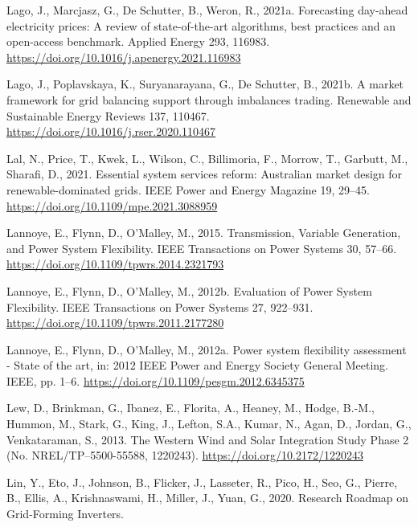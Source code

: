 \documentclass[12pt,a4paper,]{report}
\newlength{\cslhangindent}
\newenvironment{CSLReferences}[2] %
 {%
  \setlength{\parindent}{0pt}
  \ifodd #1 \everypar{\setlength{\hangindent}{\cslhangindent}}\ignorespaces\fi
  \ifnum #2 > 0
  \setlength{\parskip}{#2\baselineskip}
  \fi
 }%
 {}
\begin{document}
\begin{CSLReferences}{1}{0}
\leavevmode{}%
Lago, J., Marcjasz, G., De Schutter, B., Weron, R., 2021a. Forecasting
day-ahead electricity prices: {A} review of state-of-the-art algorithms,
best practices and an open-access benchmark. Applied Energy 293, 116983.
\url{https://doi.org/10.1016/j.apenergy.2021.116983}

\leavevmode{}%
Lago, J., Poplavskaya, K., Suryanarayana, G., De Schutter, B., 2021b. A
market framework for grid balancing support through imbalances trading.
Renewable and Sustainable Energy Reviews 137, 110467.
\url{https://doi.org/10.1016/j.rser.2020.110467}

\leavevmode{}%
Lal, N., Price, T., Kwek, L., Wilson, C., Billimoria, F., Morrow, T.,
Garbutt, M., Sharafi, D., 2021. Essential system services reform:
{Australian} market design for renewable-dominated grids. IEEE Power and
Energy Magazine 19, 29--45.
\url{https://doi.org/10.1109/mpe.2021.3088959}

\leavevmode{}%
Lannoye, E., Flynn, D., O'Malley, M., 2015. Transmission, {Variable
Generation}, and {Power System Flexibility}. IEEE Transactions on Power
Systems 30, 57--66. \url{https://doi.org/10.1109/tpwrs.2014.2321793}

\leavevmode{}%
Lannoye, E., Flynn, D., O'Malley, M., 2012b. Evaluation of {Power System
Flexibility}. IEEE Transactions on Power Systems 27, 922--931.
\url{https://doi.org/10.1109/tpwrs.2011.2177280}

\leavevmode{}%
Lannoye, E., Flynn, D., O'Malley, M., 2012a. Power system flexibility
assessment - {State} of the art, in: 2012 {IEEE Power} and {Energy
Society General Meeting}. {IEEE}, pp. 1--6.
\url{https://doi.org/10.1109/pesgm.2012.6345375}

\leavevmode{}%
Lew, D., Brinkman, G., Ibanez, E., Florita, A., Heaney, M., Hodge,
B.-M., Hummon, M., Stark, G., King, J., Lefton, S.A., Kumar, N., Agan,
D., Jordan, G., Venkataraman, S., 2013. The {Western Wind} and {Solar
Integration Study Phase} 2 (No. NREL/TP--5500-55588, 1220243).
\url{https://doi.org/10.2172/1220243}

\leavevmode{}%
Lin, Y., Eto, J., Johnson, B., Flicker, J., Lasseter, R., Pico, H., Seo,
G., Pierre, B., Ellis, A., Krishnaswami, H., Miller, J., Yuan, G., 2020.
Research {Roadmap} on {Grid-Forming Inverters}.


\end{CSLReferences}
\end{document}
